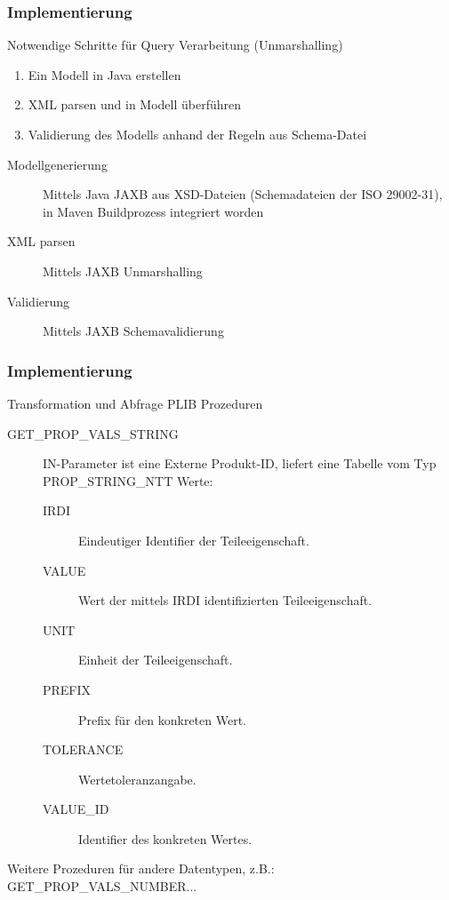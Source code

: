 \documentclass[serif,mathserif]{beamer}
\begin{document}
\begin{frame}
  \frametitle{Implementierung}
  Notwendige Schritte für Query Verarbeitung (Unmarshalling)
  \begin{enumerate}
  \item Ein Modell in Java erstellen
  \item XML parsen und in Modell überführen
  \item Validierung des Modells anhand der Regeln aus Schema-Datei
  \end{enumerate}
  
  \begin{description}
\item[Modellgenerierung] Mittels Java JAXB aus XSD-Dateien (Schemadateien der ISO 29002-31), in Maven Buildprozess integriert worden
\item[XML parsen] Mittels JAXB Unmarshalling 
\item[Validierung] Mittels JAXB Schemavalidierung
\end{description}

\end{frame}


\begin{frame}
  \frametitle{Implementierung}
 Transformation und Abfrage PLIB Prozeduren
\begin{description}
\item[GET\_PROP\_VALS\_STRING] IN-Parameter ist eine Externe Produkt-ID, liefert eine Tabelle vom Typ PROP\_STRING\_NTT 
Werte: 
  \begin{description}
  \item[IRDI] Eindeutiger Identifier der Teileeigenschaft.
  \item[VALUE] Wert der mittels IRDI identifizierten Teileeigenschaft.
  \item[UNIT] Einheit der Teileeigenschaft.
  \item[PREFIX] Prefix für den konkreten Wert.
  \item[TOLERANCE] Wertetoleranzangabe.
  \item[VALUE\_ID] Identifier des konkreten Wertes.
  \end{description}

  \end{description}
  
  Weitere Prozeduren für andere Datentypen, z.B.: GET\_PROP\_VALS\_NUMBER...
  \end{frame}
\end{document}
